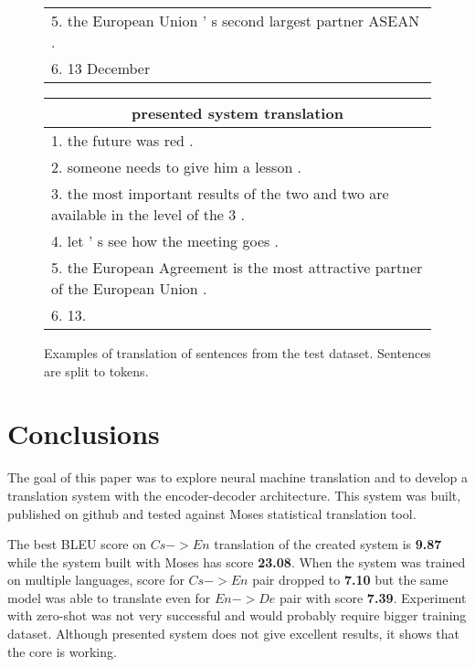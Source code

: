 \documentclass{ExcelAtFIT}
\begin{document}
\begin{figure}[h!]
\begin{center}
\begin{tabular}{|p{1\linewidth}|}
          5. the European Union ' s second largest partner ASEAN . \\
          6. 13 December \\
          \hline
        \end{tabular}
    \end{center}
    \begin{center}
        \begin{tabular}{|p{1\linewidth}|}
          \hline
          \multicolumn{1}{|c|}{presented system translation} \\
          \hline
          1. the future was red . \\
          2. someone needs to give him a lesson . \\
          3. the most important results of the two and two are available in the level of the 3 . \\
          4. let ' s see how the meeting goes . \\
          5. the European Agreement is the most attractive partner of the European Union . \\
          6. 13. \\
          \hline
        \end{tabular}
    \end{center}
	\caption{Examples of translation of sentences from the test dataset. Sentences are split to tokens.}
	\label{figure:translationExamples}
\end{figure}


\section{Conclusions}
\label{sec:Conclusions}

The goal of this paper was to explore neural machine translation and to develop a translation system with the encoder-decoder architecture. This system was built, published on github and tested against Moses statistical translation tool.

The best BLEU score on $Cs->En$ translation of the created system is \textbf{9.87} while the system built with Moses has score \textbf{23.08}. When the system was trained on multiple languages, score for $Cs->En$ pair dropped to \textbf{7.10} but the same model was able to translate even for $En->De$ pair with score \textbf{7.39}. Experiment with zero-shot was not very successful and would probably require bigger training dataset. Although presented system does not give excellent results, it shows that the core is working.
\end{document}
